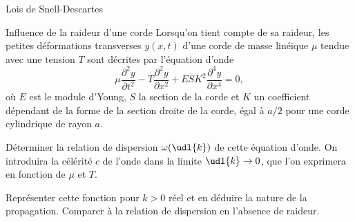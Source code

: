 

\begin{exo}[PC][1][colle]{Lois de Snell-Descartes}
  
  
\end{exo}


\begin{exo}[PC][2][TD]{Influence de la raideur d'une corde}
  Lorsqu'on tient compte de sa raideur, les petites déformations transverses $y(x, t)$ d'une corde de masse linéique $\mu$ tendue avec une tension $T$ sont décrites par l'équation d'onde
  $$
  \mu \frac{\partial^2 y}{\partial t^2}-T \frac{\partial^2 y}{\partial x^2}+E S K^2 \frac{\partial^4 y}{\partial x^4}=0,
  $$
  où $E$ est le module d'Young, $S$ la section de la corde et $K$ un coefficient dépendant de la forme de la section droite de la corde, égal à $a / 2$ pour une corde cylindrique de rayon $a$.
  \begin{quest}
    \item Déterminer la relation de dispersion $\omega(\udl{k})$ de cette équation d'onde. On introduira la célérité $c$ de l'onde dans la limite $\udl{k} \rightarrow 0$, que l'on exprimera en fonction de $\mu$ et $T$.
    \item
    Représenter cette fonction pour $k>0$ réel et en déduire la nature de la propagation. Comparer à la relation de dispersion en l'absence de raideur.
    \sol{

}
\end{quest}
\end{exo}
